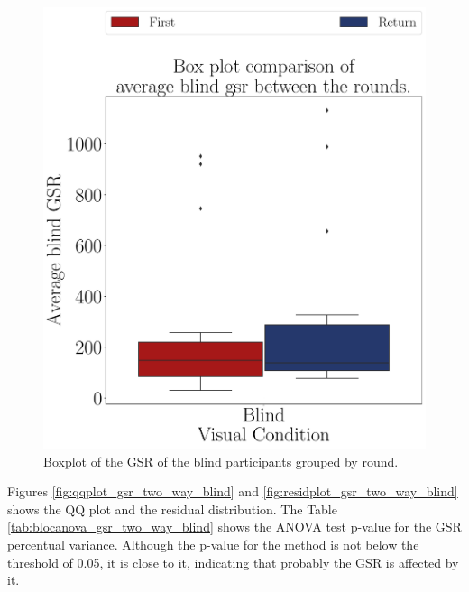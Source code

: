 \begin{figure}[!htb]
\begin{minipage}{0.45\textwidth}
        \centering
        \includegraphics[width = \textwidth]{Resultados/GSR/Figuras/pdf/boxplot_gsr_avg_blind_rounds.pdf}
        \caption{Boxplot of the GSR of the blind participants grouped by round.}
        \label{fig:boxplot_gsr_avg_blind_rounds}
    \end{minipage}
\end{figure}

Figures \ref{fig:qqplot_gsr_two_way_blind} and \ref{fig:residplot_gsr_two_way_blind} shows the QQ plot and the residual distribution. The Table \ref{tab:blocanova_gsr_two_way_blind} shows the ANOVA test p-value for the GSR percentual variance. Although the p-value for the method is not below the threshold of 0.05, it is close to it, indicating that probably the GSR is affected by it. 

